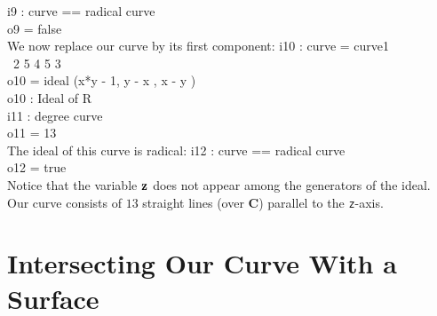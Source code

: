 \beginOutput
i9 : curve == radical curve\\
\emptyLine
o9 = false\\
\endOutput
We now replace our curve by its first component:
\beginOutput
i10 : curve = curve1\\
\emptyLine
\                2       5    4   5    3\\
o10 = ideal (x*y  - 1, y  - x , x  - y )\\
\emptyLine
o10 : Ideal of R\\
\endOutput
\beginOutput
i11 : degree curve\\
\emptyLine
o11 = 13\\
\endOutput
The ideal of this curve is radical:
\beginOutput
i12 : curve == radical curve\\
\emptyLine
o12 = true\\
\endOutput
Notice that the variable ${\bf z}$ does not appear
among the generators of the ideal. Our curve consists of
$13$ straight lines (over {\bf C}) parallel to the {\tt z}-axis.

\section{Intersecting Our Curve With a Surface}

